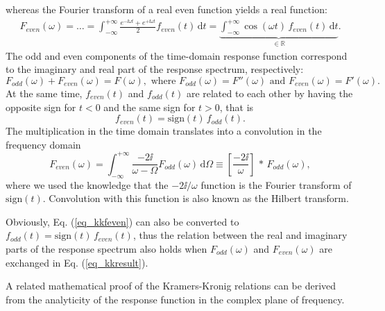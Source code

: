 whereas the Fourier transform of a real even function yields a real function:
\begin{equation} 
\begin{split} 
F_{even}(\omega)= \ldots =   \int_{-\infty}^{+\infty} \frac{e^{-\ii \omega t}+e^{+\ii \omega t}}{2} f_{even}(t) \,\mbox{d}t 
		 = \underbrace{\int_{-\infty}^{+\infty} \cos(\omega t) \, f_{even}(t) \,\mbox{d}t}_{\mbox{$\in \mathbb{R}$}}.
\end{split} 
\label{eq_kkFeven}\end{equation}
The odd and even components of the time-domain response function correspond to the imaginary and real part of the response spectrum, respectively:
\begin{equation} F_{odd}(\omega) + F_{even}(\omega) = F(\omega), \text{ where } F_{odd}(\omega) = F''(\omega) \text{ and } F_{even}(\omega) = F'(\omega).  \label{eq_kkFodd}\end{equation}
At the same time, $f_{even}(t)$ and $f_{odd}(t)$ are related to each other by having the opposite sign for $t<0$ and the same sign for $t>0$, that is 
\begin{equation} f_{even}(t) = \mbox{sign}(t)\,f_{odd}(t). \label{eq_kkfeven}\end{equation}
The multiplication in the time domain translates into a convolution in the frequency domain
\begin{equation} 
F_{even}(\omega) = \int_{-\infty}^{+\infty}  \frac{-2\ii}{\omega - \Omega} F_{odd}(\omega) \,\mbox{d}\Omega  \equiv  \left[\frac{-2\ii}{\omega}\right]\,\ast\,F_{odd}(\omega),
\label{eq_kkresult}\end{equation} 
where we used the knowledge that the $-2\ii/\omega$ function is the Fourier transform of $\mbox{sign}(t)$. Convolution with this function is also known as the Hilbert transform.%

Obviously, Eq. (\ref{eq_kkfeven}) can also be converted to $f_{odd}(t) = \mbox{sign}(t)\,f_{even}(t)$, thus the relation between the real and imaginary parts of the response spectrum also holds when $F_{odd}(\omega)$ and $F_{even}(\omega)$ are exchanged in Eq. (\ref{eq_kkresult}). 

A related mathematical proof of the Kramers-Kronig relations can be derived from the analyticity of the response function in the complex plane of frequency. \cite[p. 125]{klingshirn2007semiconductor}


